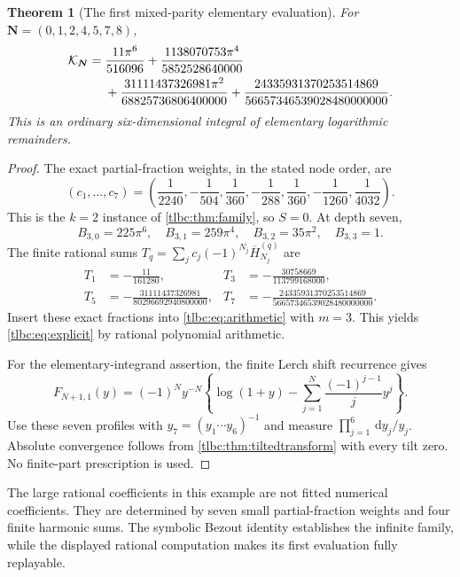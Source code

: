 \documentclass[11pt,letterpaper]{article}
\numberwithin{equation}{section}
\newtheorem{theorem}{Theorem}[section]
\theoremstyle{definition}\newtheorem{definition}[theorem]{Definition}
\theoremstyle{remark}\newtheorem{remark}[theorem]{Remark}
\newcommand{\dd}{\,\mathrm d}\newcommand{\ii}{\mathrm i}
\begin{document}
\begin{theorem}[The first mixed-parity elementary evaluation]\label{tlbc:thm:explicit}
For $\boldsymbol N=(0,1,2,4,5,7,8)$,
\begin{align}\label{tlbc:eq:explicit}
 \mathcal K_{\boldsymbol N}
 ={}&\frac{11\pi^6}{516096}
       +\frac{1138070753\pi^4}{5852528640000}\notag\\
    &+\frac{31111437326981\pi^2}{68825736806400000}
       +\frac{24335931370253514869}{56657346539028480000000}.
\end{align}
This is an ordinary six-dimensional integral of elementary logarithmic remainders.
\end{theorem}
\begin{proof}
The exact partial-fraction weights, in the stated node order, are
\begin{equation}\label{tlbc:eq:explicitweights}
 (c_1,\ldots,c_7)=
 \left(\frac1{2240},-\frac1{504},\frac1{360},-\frac1{288},
       \frac1{360},-\frac1{1260},\frac1{4032}\right).
\end{equation}
This is the $k=2$ instance of \cref{tlbc:thm:family}, so $S=0$. At depth seven,
\[
 B_{3,0}=225\pi^6,\quad B_{3,1}=259\pi^4,\quad
 B_{3,2}=35\pi^2,\quad B_{3,3}=1.
\]
The finite rational sums $T_q=\sum_jc_j(-1)^{N_j}\overline H_{N_j}^{(q)}$ are
\begin{align*}
 T_1&=-\frac{11}{161280},&
 T_3&=-\frac{30758669}{113799168000},\\
 T_5&=-\frac{31111437326981}{80296692940800000},&
 T_7&=-\frac{24335931370253514869}{56657346539028480000000}.
\end{align*}
Insert these exact fractions into \eqref{tlbc:eq:arithmetic} with $m=3$. This yields \eqref{tlbc:eq:explicit} by rational polynomial arithmetic.

For the elementary-integrand assertion, the finite Lerch shift recurrence gives
\begin{equation}\label{tlbc:eq:elementaryprofile}
 F_{N+1,1}(y)=(-1)^Ny^{-N}
 \left\{\log(1+y)-\sum_{j=1}^N\frac{(-1)^{j-1}}j y^j\right\}.
\end{equation}
Use these seven profiles with $y_7=(y_1\cdots y_6)^{-1}$ and measure $\prod_{j=1}^6\dd y_j/y_j$. Absolute convergence follows from \cref{tlbc:thm:tiltedtransform} with every tilt zero. No finite-part prescription is used.
\end{proof}

The large rational coefficients in this example are not fitted numerical coefficients. They are determined by seven small partial-fraction weights and four finite harmonic sums. The symbolic Bezout identity establishes the infinite family, while the displayed rational computation makes its first evaluation fully replayable.
\end{document}
